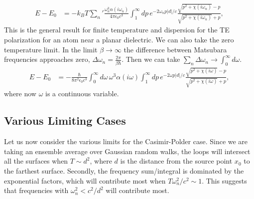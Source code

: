 \begin{align}
E-E_0&=-k_BT{\sum_n}'\frac{\omega_n^3\alpha(i\omega_n)}{4\pi\epsilon_0c^3}\int_1^\infty dp\,e^{-2\omega_n p|d|/c}
\frac{\sqrt{p^2+\chi(i\omega_n)}-p}{\sqrt{p^2+\chi(i\omega_n)}+p},
\label{eq:TE_CP_finite_temperature}
\end{align}
This is the general result for finite temperature and dispersion for the TE polarization for an atom near 
a planar dielectric.
  We can also take the zero temperature limit.
  In the limit $\beta\rightarrow \infty$ the difference between Matsubara frequencies approaches zero,
 $\Delta\omega_n =\frac{2\pi}{\beta\hbar}$.  Then we can take $\sum_n\Delta\omega_n \rightarrow \int_0^\infty d\omega$.
\begin{align}
E-E_0&=-\frac{\hbar}{8\pi^2\epsilon_0c^3}\int_0^\infty d\omega\,\omega^3\alpha(i\omega)
\int_1^\infty dp\,e^{-2\omega p|d|/c}\frac{\sqrt{p^2+\chi(i\omega)}-p}{\sqrt{p^2+\chi(i\omega)}+p},\label{eq:TE_CP_zero_temperature}
\end{align}
where now $\omega$ is a continuous variable.  

\subsection{Various Limiting Cases}

Let us now consider the various limits for the Casimir-Polder case.
  Since we are taking an ensemble average over Gaussian random walks,
 the loops will intersect all the surfaces when $T\sim d^2$, 
where $d$ is the distance from the source point $x_0$ to the farthest surface.
  Secondly, the frequency sum/integral is dominated by the exponential factors,
 which will contribute most when $T\omega_n^2/c^2\sim 1$.
  This suggests that frequencies with  $\omega_n^2< c^2/d^2$  will contribute most.   


